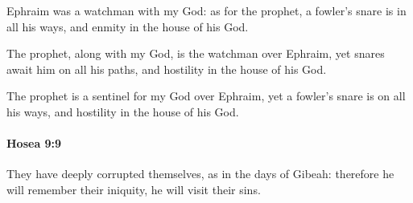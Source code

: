 			\begin{versebox}
					\item[BHS] 
					\item[LXX] 
					\item[ASV] Ephraim was a watchman with my God: as for the prophet, a fowler's snare is in all his ways, and enmity in the house of his God.
					\item[NIV] The prophet, along with my God, is the watchman over Ephraim, yet snares await him on all his paths, and hostility in the house of his God.
					\item[NRSV] The prophet is a sentinel for my God over Ephraim, yet a fowler’s snare is on all his ways, and hostility in the house of his God.
			\end{versebox}

		\paragraph{Hosea 9:9} %
			\label{HOSEA-9-9}

			They have deeply corrupted themselves, as in the days of Gibeah: therefore he will remember their iniquity, he will visit their sins.

